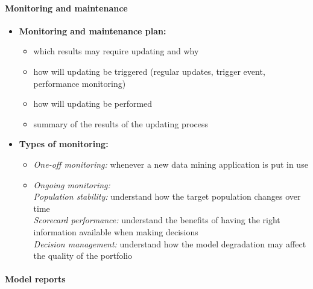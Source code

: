 \documentclass[a4paper, landscape, 6pt, fleqn]{scrartcl}
\renewcommand{\emph}[1]{\textbf{#1}}
\begin{document}
\begin{multicols*}{4}
\paragraph{Monitoring and maintenance}

\begin{itemize}
\item \emph{Monitoring and maintenance plan:}
\begin{itemize}
\item which results may require updating and why
\item how will updating be triggered (regular updates, trigger event, performance monitoring)
\item how will updating be performed
\item summary of the results of the updating process
\end{itemize}
\item \emph{Types of monitoring:}
\begin{itemize}
\item \textit{One-off monitoring:} whenever a new data mining application is put in use
\item \textit{Ongoing monitoring:} \\
\textit{Population stability:} understand how the target population changes over time \\
\textit{Scorecard performance:} understand the benefits of having the right information available when making decisions \\
\textit{Decision management:} understand how the model degradation may affect the quality of the portfolio
\end{itemize}
\end{itemize}

\paragraph{Model reports}


\end{multicols*}
\end{document}

